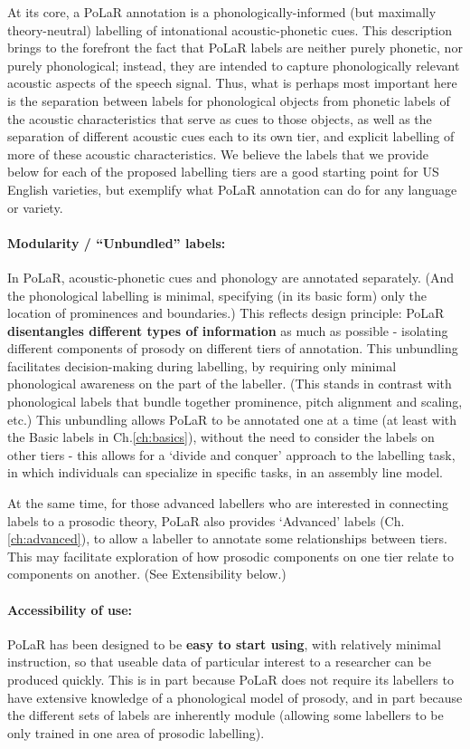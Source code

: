 At its core, a PoLaR annotation is a phonologically-informed (but maximally theory-neutral) labelling of intonational acoustic-phonetic cues. This description brings to the forefront the fact that PoLaR labels are neither purely phonetic, nor purely phonological; instead, they are intended to capture phonologically relevant acoustic aspects of the speech signal. Thus, what is perhaps most important here is the separation between labels for phonological objects from phonetic labels of the acoustic characteristics that serve as cues to those objects, as well as the separation of different acoustic cues each to its own tier, and explicit labelling of more of these acoustic characteristics. We believe the labels that we provide below for each of the proposed labelling tiers are a good starting point for US English varieties, but exemplify what PoLaR annotation can do for any language or variety.

\paragraph{Modularity / “Unbundled” labels:}
In PoLaR, acoustic-phonetic cues and phonology are annotated separately. (And the phonological labelling is minimal, specifying (in its basic form) only the location of prominences and boundaries.) This reflects design principle: PoLaR \textbf{disentangles different types of information} as much as possible - isolating different components of prosody on different tiers of annotation. This unbundling facilitates decision-making during labelling, by requiring only minimal phonological awareness on the part of the labeller. (This stands in contrast with phonological labels that bundle together prominence, pitch alignment and scaling, etc.) This unbundling allows PoLaR to be annotated one at a time (at least with the Basic labels in Ch.\ref{ch:basics}), without the need to consider the labels on other tiers - this allows for a ‘divide and conquer’ approach to the labelling task, in which individuals can specialize in specific tasks, in an assembly line model.

At the same time, for those advanced labellers who are interested in connecting labels to a prosodic theory, PoLaR also provides ‘Advanced’ labels (Ch.\ref{ch:advanced}), to allow a labeller to annotate some relationships between tiers. This may facilitate exploration of how prosodic components on one tier relate to components on another. (See Extensibility below.)

\paragraph{Accessibility of use:}
PoLaR has been designed to be \textbf{easy to start using}, with relatively minimal instruction, so that useable data of particular interest to a researcher can be produced quickly.  This is in part because PoLaR does not require its labellers to have extensive knowledge of a phonological model of prosody, and in part because the different sets of labels are inherently module (allowing some labellers to be only trained in one area of prosodic labelling).

